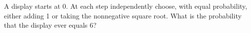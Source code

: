 A display starts at 0. At each step independently choose, with equal probability, either adding 1 or taking the nonnegative square root. What is the probability that the display ever equals 6?
